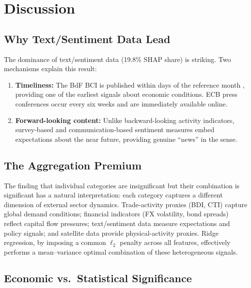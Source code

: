 \section{Discussion}
\label{sec:ch2_discussion}

\subsection{Why Text/Sentiment Data Lead}

The dominance of text/sentiment data (19.8\% SHAP share) is striking.  Two mechanisms explain this result:
\begin{enumerate}
  \item \textbf{Timeliness:} The BdF BCI is published within days of the reference month \citep{banquefrance2023}, providing one of the earliest signals about economic conditions.  ECB press conferences occur every six weeks and are immediately available online.
  \item \textbf{Forward-looking content:} Unlike backward-looking activity indicators, survey-based and communication-based sentiment measures embed expectations about the near future, providing genuine ``news'' in the \citet{giannone2008nowcasting} sense.
\end{enumerate}

\subsection{The Aggregation Premium}

The finding that individual categories are insignificant but their combination is significant has a natural interpretation: each category captures a different dimension of external sector dynamics.  Trade-activity proxies (BDI, CTI) capture global demand conditions; financial indicators (FX volatility, bond spreads) reflect capital flow pressures; text/sentiment data measure expectations and policy signals; and satellite data provide physical-activity proxies.  Ridge regression, by imposing a common $\ell_2$ penalty across all features, effectively performs a mean--variance optimal combination of these heterogeneous signals.

\subsection{Economic vs.\ Statistical Significance}

